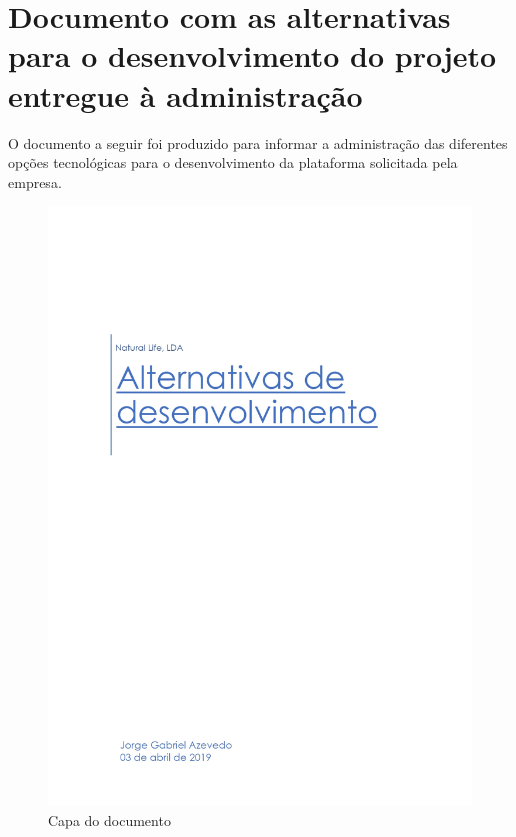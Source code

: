 \renewcommand{\appendixname}{Anexo}
\appendix
\chapter{Documento com as alternativas para o desenvolvimento do projeto entregue à administração}
\label{anexo:A}

O documento a seguir foi produzido para informar a administração das diferentes opções tecnológicas para o desenvolvimento da plataforma solicitada pela empresa.

\newpage

\begin{figure}[H]
	\centering
	\includegraphics[width=\linewidth, frame]{figuras/Alternativas/pag0.jpg}
	\caption{Capa do documento}
	\label{fig:anexo_a_capa}
\end{figure}
\newpage

